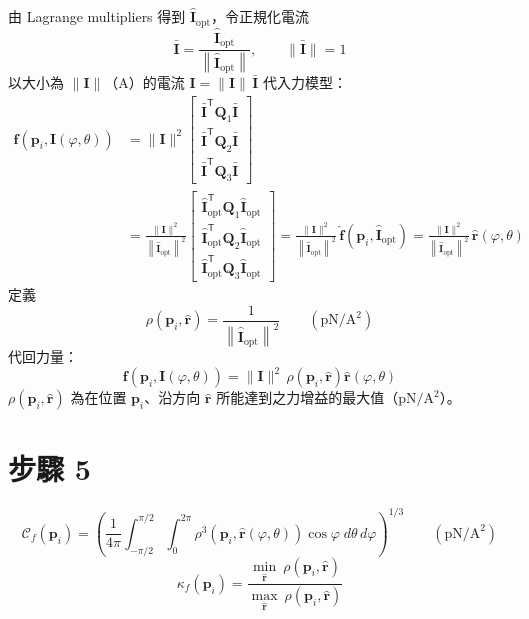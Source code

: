 \documentclass[11pt]{article}
\newcommand{\rh}{\hat{\mathbf{r}}}
\begin{document}
由 Lagrange multipliers 得到 $\hat{\mathbf{I}}_{\mathrm{opt}}$，令正規化電流
\[
\bar{\mathbf{I}}=\frac{\hat{\mathbf{I}}_{\mathrm{opt}}}{\left\|\hat{\mathbf{I}}_{\mathrm{opt}}\right\|},\qquad
\|\bar{\mathbf{I}}\|=1
\]
以大小為 $\|\mathbf{I}\|$（A）的電流 $\mathbf{I}=\|\mathbf{I}\|\,\bar{\mathbf{I}}$ 代入力模型：
\[
\begin{aligned}
\mathbf{f}\!\left(\mathbf{p}_i,\mathbf{I}(\varphi,\theta)\right)
&=\|\mathbf{I}\|^2
\begin{bmatrix}
\bar{\mathbf{I}}^{\mathsf T}\mathbf{Q}_1\bar{\mathbf{I}}\\[2pt]
\bar{\mathbf{I}}^{\mathsf T}\mathbf{Q}_2\bar{\mathbf{I}}\\[2pt]
\bar{\mathbf{I}}^{\mathsf T}\mathbf{Q}_3\bar{\mathbf{I}}
\end{bmatrix}\\[6pt]
&=\frac{\|\mathbf{I}\|^2}{\left\|\hat{\mathbf{I}}_{\mathrm{opt}}\right\|^2}
\begin{bmatrix}
\hat{\mathbf{I}}_{\mathrm{opt}}^{\mathsf T}\mathbf{Q}_1\hat{\mathbf{I}}_{\mathrm{opt}}\\[2pt]
\hat{\mathbf{I}}_{\mathrm{opt}}^{\mathsf T}\mathbf{Q}_2\hat{\mathbf{I}}_{\mathrm{opt}}\\[2pt]
\hat{\mathbf{I}}_{\mathrm{opt}}^{\mathsf T}\mathbf{Q}_3\hat{\mathbf{I}}_{\mathrm{opt}}
\end{bmatrix}
=\frac{\|\mathbf{I}\|^2}{\left\|\hat{\mathbf{I}}_{\mathrm{opt}}\right\|^2}\,\hat{\mathbf{f}}\!\left(\mathbf{p}_i,\hat{\mathbf{I}}_{\mathrm{opt}}\right)
=\frac{\|\mathbf{I}\|^2}{\left\|\hat{\mathbf{I}}_{\mathrm{opt}}\right\|^2}\,\rh(\varphi,\theta)
\end{aligned}
\]
定義
\[
\rho\!\left(\mathbf{p}_i,\rh\right)=\frac{1}{\left\|\hat{\mathbf{I}}_{\mathrm{opt}}\right\|^2}
\qquad(\mathrm{pN/A^2})
\]
代回力量：
\[
\mathbf{f}\!\left(\mathbf{p}_i,\mathbf{I}(\varphi,\theta)\right)=\|\mathbf{I}\|^2\,\rho\!\left(\mathbf{p}_i,\rh\right)\rh(\varphi,\theta)
\]
$\rho(\mathbf{p}_i,\rh)$ 為在位置 $\mathbf{p}_i$、沿方向 $\rh$ 所能達到之力增益的最大值（$\mathrm{pN/A^2}$）。

\section*{步驟 5}

\[
\mathcal{C}_f(\mathbf{p}_i)
=\left(\frac{1}{4\pi}\int_{-\pi/2}^{\pi/2}\int_{0}^{2\pi}\rho^3\!\left(\mathbf{p}_i,\rh(\varphi,\theta)\right)\cos\varphi\;d\theta\,d\varphi\right)^{1/3}
\qquad(\mathrm{pN/A^2})
\]
\[
\kappa_f(\mathbf{p}_i)
=\frac{\displaystyle\min_{\rh}\ \rho\!\left(\mathbf{p}_i,\rh\right)}{\displaystyle\max_{\rh}\ \rho\!\left(\mathbf{p}_i,\rh\right)}
\]
\end{document}
